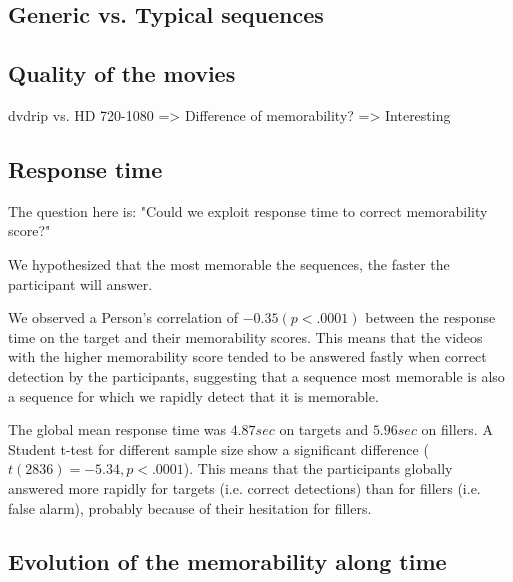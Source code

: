\documentclass[sigconf]{acmart}
\begin{document}
\subsection{Generic vs. Typical sequences}

\subsection{Quality of the movies}
dvdrip vs. HD 720-1080 => Difference of memorability? => Interesting

\subsection{Response time}

The question here is: "Could we exploit response time to correct memorability score?"

We hypothesized that the most memorable the sequences, the faster the participant will answer.

We observed a Person's correlation of $-0.35 (p<.0001)$ between the response time on the target and their memorability scores. This means that the videos with the higher memorability score tended to be answered fastly when correct detection by the participants, suggesting that a sequence most memorable is also a sequence for which we rapidly detect that it is memorable.

The global mean response time was $4.87 sec$ on targets and $5.96 sec$ on fillers.
A Student t-test for different sample size show a significant difference ($t(2836)=-5.34, p<.0001$). This means that the participants globally answered more rapidly for targets (i.e. correct detections) than for fillers (i.e. false alarm), probably because of their hesitation for fillers.

\subsection{Evolution of the memorability along time}
\end{document}
